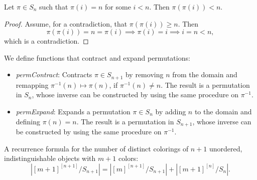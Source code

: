 \begin{proposition}
  \label{prop:perm-perm-val-lt-of-perm-val-eq}
  \leanok
  Let $\pi \in S_n$ such that $\pi(i) = n$ for some $i < n$. Then $\pi(\pi(i)) < n$.
\end{proposition}

\begin{proof}
  \leanok
  Assume, for a contradiction, that $\pi(\pi(i)) \geq n$. Then
  \begin{equation*}
    \pi(\pi(i)) = n = \pi(i) \implies \pi(i) = i \implies i = n < n,
  \end{equation*}
  which is a contradiction.
\end{proof}

\begin{definition}
  \label{def:perm-contract-expand}
  \leanok
  We define functions that contract and expand permutations:
  \begin{itemize}
    \item \emph{permContract}: Contracts $\pi \in S_{n + 1}$ by removing $n$ from the domain and remapping $\pi^{-1}(n) \mapsto \pi(n)$, if $\pi^{-1}(n) \neq n$. The result is a permutation in $S_n$, whose inverse can be constructed by using the same procedure on $\pi^{-1}$.

    \item \emph{permExpand}: Expands a permutation $\pi \in S_n$ by adding $n$ to the domain and defining $\pi(n) = n$. The result is a permutation in $S_{n + 1}$, whose inverse can be constructed by using the same procedure on $\pi^{-1}$.
  \end{itemize}
\end{definition}

\begin{proposition}
  \label{prop:numDistinctColoringsOfPerm-succ-succ}
  \leanok
  A recurrence formula for the number of distinct colorings of $n + 1$ unordered, indistinguishable objects with $m + 1$ colors:
  \begin{equation*}
    |[m + 1]^{[n + 1]}/S_{n + 1}| = |[m]^{[n + 1]}/S_{n + 1}| + |[m + 1]^{[n]}/S_n|.
  \end{equation*}
\end{proposition}

